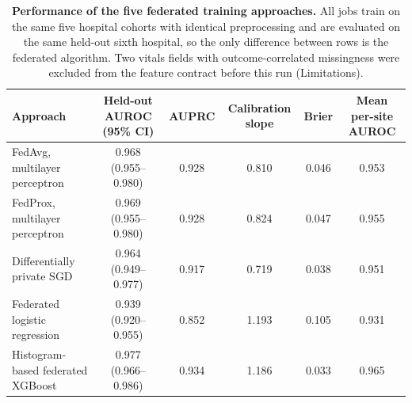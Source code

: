 \begin{table}[ht]
\centering
\small
\caption{\textbf{Performance of the five federated training approaches.} All jobs
train on the same five hospital cohorts with identical preprocessing and are
evaluated on the same held-out sixth hospital, so the only difference between rows
is the federated algorithm. Two vitals fields with outcome-correlated missingness
were excluded from the feature contract before this run (Limitations).}
\label{tab:casestudyperformance}
\begin{tabular}{lccccc}
\toprule
Approach & Held-out AUROC (95\% CI) & AUPRC & Calibration slope & Brier & Mean per-site AUROC \\
\midrule
FedAvg, multilayer perceptron & 0.968 (0.955--0.980) & 0.928 & 0.810 & 0.046 & 0.953 \\
FedProx, multilayer perceptron & 0.969 (0.955--0.980) & 0.928 & 0.824 & 0.047 & 0.955 \\
Differentially private SGD & 0.964 (0.949--0.977) & 0.917 & 0.719 & 0.038 & 0.951 \\
Federated logistic regression & 0.939 (0.920--0.955) & 0.852 & 1.193 & 0.105 & 0.931 \\
Histogram-based federated XGBoost & 0.977 (0.966--0.986) & 0.934 & 1.186 & 0.033 & 0.965 \\
\bottomrule
\end{tabular}
\end{table}
